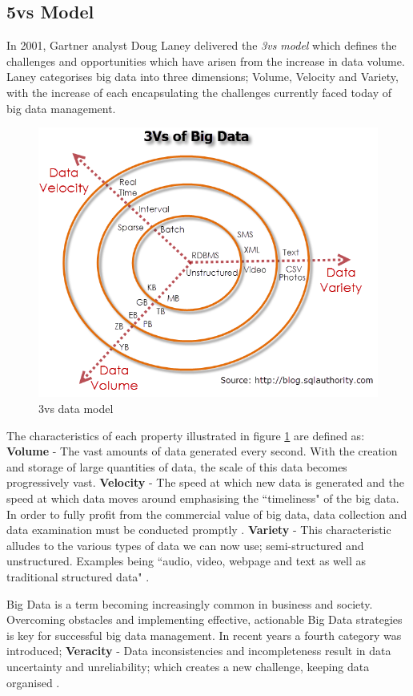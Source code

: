 \subsection{5vs Model}\label{5vs}
In 2001, Gartner analyst Doug Laney delivered the \textit{3vs model} which defines the challenges and opportunities which have arisen from the increase in data volume. Laney categorises big data into three dimensions; Volume, Velocity and Variety, with the increase of each encapsulating the challenges currently faced today of big data management. \begin{figure}[h]\begin{center}\includegraphics[width=0.8\linewidth]{images/3vs}\caption{3vs data model}\label{fig:3vs}\end{center}\end{figure}

\parindent 0pt The characteristics of each property illustrated in figure \ref{fig:3vs} are defined as: \textbf{Volume} - The vast amounts of data generated every second. With the creation and storage of large quantities of data, the scale of this data becomes progressively vast. \textbf{Velocity} -  The speed at which new data is generated and the speed at which data moves around emphasising the ``timeliness" of the big data. In order to fully profit from the commercial value of big data, data collection and data examination must be conducted promptly . \textbf{Variety} - This characteristic alludes to the various types of data we can now use; semi-structured and unstructured. Examples being ``audio, video, webpage and text as well as traditional structured data" \cite{bigdata}.

\parindent 15pt Big Data is a term becoming increasingly common in business and society. Overcoming obstacles and implementing effective, actionable Big Data strategies is key for successful big data management. In recent years a fourth category was introduced; \textbf{Veracity} - Data inconsistencies and incompleteness result in data uncertainty and unreliability; which creates a new challenge, keeping data organised \cite{bigdata}.

